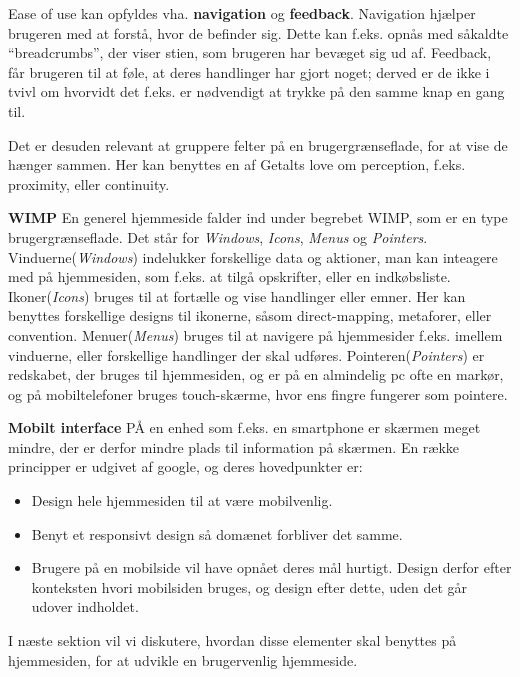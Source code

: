 Ease of use kan opfyldes vha. \textbf{navigation} og \textbf{feedback}.
Navigation hjælper brugeren med at forstå, hvor de befinder sig.
Dette kan f.eks. opnås med såkaldte ``breadcrumbs'', der viser stien, som brugeren har bevæget sig ud af.
Feedback, får brugeren til at føle, at deres handlinger har gjort noget; derved er de ikke i tvivl om hvorvidt det f.eks. er nødvendigt at trykke på den samme knap en gang til.

Det er desuden relevant at gruppere felter på en brugergrænseflade, for at vise de hænger sammen. 
Her kan benyttes en af Getalts love om perception, f.eks. proximity, eller continuity.\citep{DIS2014}

\textbf{WIMP}
En generel hjemmeside falder ind under begrebet WIMP, som er en type brugergrænseflade. Det står for \textit{Windows}, \textit{Icons}, \textit{Menus} og \textit{Pointers}.
Vinduerne(\textit{Windows}) indelukker forskellige data og aktioner, man kan inteagere med på hjemmesiden, som f.eks. at tilgå opskrifter, eller en indkøbsliste.
Ikoner(\textit{Icons}) bruges til at fortælle og vise handlinger eller emner.
Her kan benyttes forskellige designs til ikonerne, såsom direct-mapping, metaforer, eller convention.
Menuer(\textit{Menus}) bruges til at navigere på hjemmesider f.eks. imellem vinduerne, eller forskellige handlinger der skal udføres.
Pointeren(\textit{Pointers}) er redskabet, der bruges til hjemmesiden, og er på en almindelig pc ofte en markør, og på mobiltelefoner bruges touch-skærme, hvor ens fingre fungerer som pointere.


\textbf{Mobilt interface}
PÅ en enhed som f.eks. en smartphone er skærmen meget mindre, der er derfor mindre plads til information på skærmen. 
En række principper er udgivet af google\citep{Mobil}, og deres hovedpunkter er:
\begin{itemize}[nolistsep,noitemsep]
	\item Design hele hjemmesiden til at være mobilvenlig.
	\item Benyt et responsivt design så domænet forbliver det samme.
	\item Brugere på en mobilside vil have opnået deres mål hurtigt. Design derfor efter konteksten hvori mobilsiden bruges, og design efter dette, uden det går udover indholdet.
\end{itemize}

I næste sektion vil vi diskutere, hvordan disse elementer skal benyttes på hjemmesiden, for at udvikle en brugervenlig hjemmeside.


